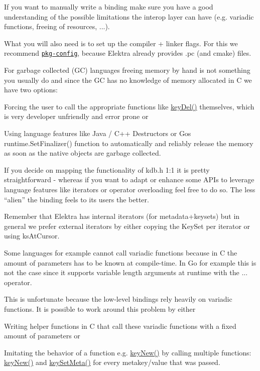 If you want to manually write a binding make sure you have a good understanding of the possible limitations the interop layer can have (e.\+g. variadic functions, freeing of resources, ...).

What you will also need is to set up the compiler + linker flags. For this we recommend \href{https://www.freedesktop.org/wiki/Software/pkg-config/}{\tt pkg-\/config}, because Elektra already provides {\ttfamily .pc} (and {\ttfamily cmake}) files.

For garbage collected (GC) languages freeing memory by hand is not something you usually do and since the GC has no knowledge of memory allocated in C we have two options\+:


\begin{DoxyItemize}
\item Forcing the user to call the appropriate functions like {\ttfamily \hyperlink{group__key_ga3df95bbc2494e3e6703ece5639be5bb1}{key\+Del()}} themselves, which is very developer unfriendly and error prone or
\item Using language features like Java / C++ Destructors or Go\textquotesingle{}s {\ttfamily runtime.\+Set\+Finalizer()} function to automatically and reliably release the memory as soon as the native objects are garbage collected.
\end{DoxyItemize}

If you decide on mapping the functionality of kdb.h 1\+:1 it is pretty straightforward -\/ whereas if you want to adapt or enhance some A\+PI\textquotesingle{}s to leverage language features like iterators or operator overloading feel free to do so. The less “alien” the binding feels to its users the better.

Remember that Elektra has internal iterators (for metadata+keysets) but in general we prefer external iterators by either copying the Key\+Set per iterator or using {\ttfamily ks\+At\+Cursor}.

Some languages for example cannot call variadic functions because in C the amount of parameters has to be known at compile-\/time. In Go for example this is not the case since it supports variable length arguments at runtime with the {\ttfamily ...} operator.

This is unfortunate because the low-\/level bindings rely heavily on variadic functions. It is possible to work around this problem by either


\begin{DoxyEnumerate}
\item Writing helper functions in C that call these variadic functions with a fixed amount of parameters or
\item Imitating the behavior of a function e.\+g. {\ttfamily \hyperlink{group__key_gad23c65b44bf48d773759e1f9a4d43b89}{key\+New()}} by calling multiple functions\+: {\ttfamily \hyperlink{group__key_gad23c65b44bf48d773759e1f9a4d43b89}{key\+New()}} and {\ttfamily \hyperlink{group__keymeta_gae1f15546b234ffb6007d8a31178652b9}{key\+Set\+Meta()}} for every metakey/value that was passed.
\end{DoxyEnumerate}

